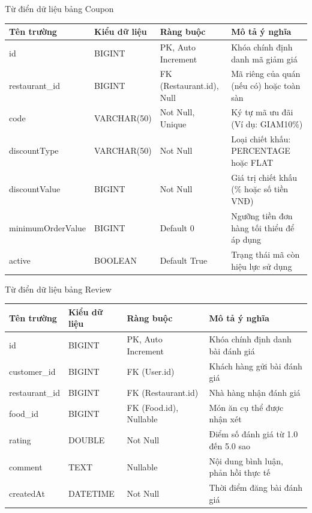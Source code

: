 \documentclass{uetgraduation}
\begin{document}
\begin{table}[!htbp]{Từ điển dữ liệu bảng Coupon}
\centering
\small
\begin{tabularx}{\textwidth}{|>{\raggedright\arraybackslash}p{2.8cm}|>{\raggedright\arraybackslash}p{3.0cm}|>{\raggedright\arraybackslash}p{3.5cm}|>{\raggedright\arraybackslash}X|}
\hline
\textbf{Tên trường} & \textbf{Kiểu dữ liệu} & \textbf{Ràng buộc} & \textbf{Mô tả ý nghĩa} \\ \hline
id & BIGINT & PK, Auto Increment & Khóa chính định danh mã giảm giá \\ \hline
restaurant\_id & BIGINT & FK (Restaurant.id), Null & Mã riêng của quán (nếu có) hoặc toàn sàn \\ \hline
code & VARCHAR(50) & Not Null, Unique & Ký tự mã ưu đãi (Ví dụ: GIAM10\%) \\ \hline
discountType & VARCHAR(50) & Not Null & Loại chiết khấu: PERCENTAGE hoặc FLAT \\ \hline
discountValue & BIGINT & Not Null & Giá trị chiết khấu (\% hoặc số tiền VNĐ) \\ \hline
minimumOrderValue & BIGINT & Default 0 & Ngưỡng tiền đơn hàng tối thiểu để áp dụng \\ \hline
active & BOOLEAN & Default True & Trạng thái mã còn hiệu lực sử dụng \\ \hline
\end{tabularx}
\end{table}

\begin{table}[!htbp]{Từ điển dữ liệu bảng Review}
\centering
\small
\begin{tabularx}{\textwidth}{|>{\raggedright\arraybackslash}p{2.8cm}|>{\raggedright\arraybackslash}p{3.0cm}|>{\raggedright\arraybackslash}p{3.5cm}|>{\raggedright\arraybackslash}X|}
\hline
\textbf{Tên trường} & \textbf{Kiểu dữ liệu} & \textbf{Ràng buộc} & \textbf{Mô tả ý nghĩa} \\ \hline
id & BIGINT & PK, Auto Increment & Khóa chính định danh bài đánh giá \\ \hline
customer\_id & BIGINT & FK (User.id) & Khách hàng gửi bài đánh giá \\ \hline
restaurant\_id & BIGINT & FK (Restaurant.id) & Nhà hàng nhận đánh giá \\ \hline
food\_id & BIGINT & FK (Food.id), Nullable & Món ăn cụ thể được nhận xét \\ \hline
rating & DOUBLE & Not Null & Điểm số đánh giá từ 1.0 đến 5.0 sao \\ \hline
comment & TEXT & Nullable & Nội dung bình luận, phản hồi thực tế \\ \hline
createdAt & DATETIME & Not Null & Thời điểm đăng bài đánh giá \\ \hline
\end{tabularx}
\end{table}
\end{document}
